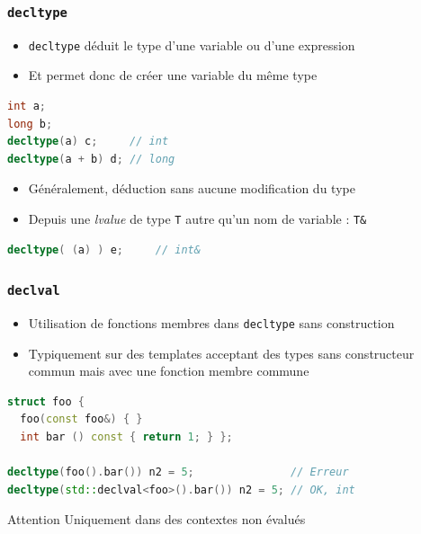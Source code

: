 \documentclass[C++.tex]{subfiles}
\begin{document}
\begin{frame}[fragile]
	\frametitle{\lstinline|decltype|}
	\begin{itemize}
		\item \lstinline|decltype| déduit le type d'une variable ou d'une expression
		\item Et permet donc de créer une variable du même type
	\end{itemize}

	\begin{lstlisting}[language=C++]
int a;
long b;
decltype(a) c;     // int
decltype(a + b) d; // long\end{lstlisting}

	\begin{itemize}
		\item Généralement, déduction sans aucune modification du type


		\item Depuis une \textit{lvalue} de type \lstinline|T| autre qu'un nom de variable : \lstinline|T&|
	\end{itemize}

	\begin{lstlisting}[language=C++]
decltype( (a) ) e;     // int&\end{lstlisting}

\end{frame}

\begin{frame}[fragile]
	\frametitle{\lstinline|declval|}
	\begin{itemize}
		\item Utilisation de fonctions membres dans \lstinline|decltype| sans construction
		\item Typiquement sur des templates acceptant des types sans constructeur commun mais avec une fonction membre commune
	\end{itemize}
	
	\begin{lstlisting}[language=C++]
struct foo {
  foo(const foo&) { }
  int bar () const { return 1; } };

decltype(foo().bar()) n2 = 5;               // Erreur
decltype(std::declval<foo>().bar()) n2 = 5; // OK, int\end{lstlisting}

	\begin{alertblock}{Attention}
		Uniquement dans des contextes non évalués
	\end{alertblock}
\end{frame}
\end{document}
